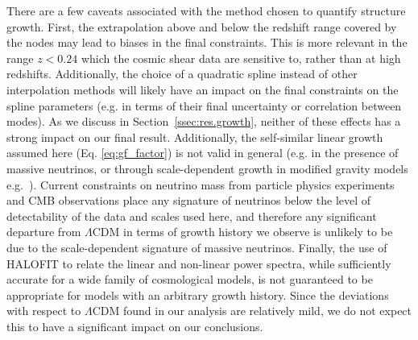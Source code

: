 \documentclass[a4paper,11pt]{article}
\newcommand{\lcdm}{$\Lambda$CDM\xspace}
\newcommand{\hfit}{\textsc{HALOFIT}\xspace}
\begin{document}
      There are a few caveats associated with the method chosen to quantify structure growth. First, the extrapolation above and below the redshift range covered by the nodes may lead to biases in the final constraints. This is more relevant in the range $z<0.24$ which the cosmic shear data are sensitive to, rather than at high redshifts. Additionally, the choice of a quadratic spline instead of other interpolation methods will likely have an impact on the final constraints on the spline parameters (e.g. in terms of their final uncertainty or correlation between modes). As we discuss in Section~\ref{ssec:res.growth}, neither of these effects has a strong impact on our final result. Additionally, the self-similar linear growth assumed here (Eq. \ref{eq:gf_factor}) is not valid in general (e.g. in the presence of massive neutrinos, or through scale-dependent growth in modified gravity models e.g.~\cite{Deffayet:2010qz}). Current constraints on neutrino mass from particle physics experiments and CMB observations place any signature of neutrinos below the level of detectability of the data and scales used here, and therefore any significant departure from \lcdm in terms of growth history we observe is unlikely to be due to the scale-dependent signature of massive neutrinos. Finally, the use of \hfit to relate the linear and non-linear power spectra, while sufficiently accurate for a wide family of cosmological models, is not guaranteed to be appropriate for models with an arbitrary growth history. Since the deviations with respect to \lcdm found in our analysis are relatively mild, we do not expect this to have a significant impact on our conclusions.
\end{document}
